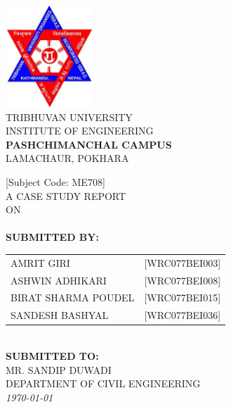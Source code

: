 \begin{titlingpage} 
    \begin{normalsize}
    \begin{center}
    \includegraphics[width=1.3in, height=1.5in]{./Graphics/logotu.jpg}\\
    \vspace{0.5cm}
    \MakeUppercase{TRIBHUVAN UNIVERSITY}\\
    \MakeUppercase{INSTITUTE OF ENGINEERING}\\
    {\fontsize{16pt}{18pt}\selectfont
    \textbf{\MakeUppercase PASHCHIMANCHAL CAMPUS}}\\
    \MakeUppercase{Lamachaur, Pokhara}
    \end{center}
    \vspace{0.5cm}
    
    \begin{center}
    [Subject Code: ME708]\\ A CASE STUDY REPORT\\ON\\
    \textbf{\MakeUppercase \thetitle} \\
    \vspace{1.5 cm}
    \textbf{SUBMITTED BY:}\\
\begin{tabular}{p{5cm} l}
    \MakeUppercase{Amrit Giri} & \MakeUppercase{[WRC077BEI003]}\\
    \MakeUppercase{Ashwin Adhikari} & \MakeUppercase{[WRC077BEI008]}\\
    \MakeUppercase{Birat Sharma Poudel} & \MakeUppercase{[WRC077BEI015]}\\
    \MakeUppercase{Sandesh Bashyal} & \MakeUppercase{[WRC077BEI036]}
\end{tabular}\\
    \vspace{2 cm}
    \textbf{SUBMITTED TO:}\\
    \MakeUppercase{Mr. Sandip Duwadi}\\
    \MakeUppercase{DEPARTMENT OF CIVIL ENGINEERING}\\
    \vspace{1.5cm}
    \textit{{\monthyeardate\today}}
    \end{center}
    \end{normalsize}
    \end{titlingpage}
    \newpage
